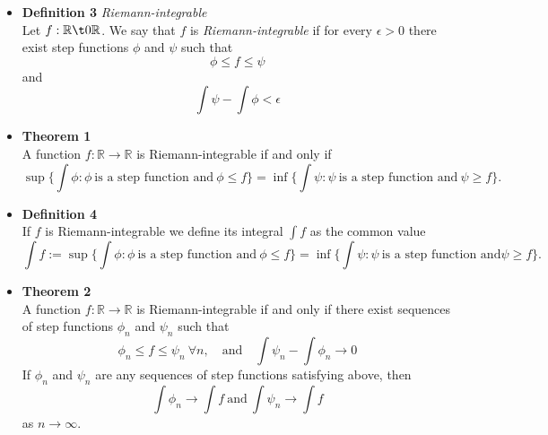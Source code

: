 \documentclass[11pt,a4paper]{article}
\begin{document}
\begin{itemize}
    \item \textbf{Definition 3} \emph{Riemann-integrable} \\
        Let $f : \mathbb{R} \t0 \mathbb{R}$.
        We say that $f$ is \emph{Riemann-integrable} if for every $\epsilon > 0$
        there exist step functions $\phi$ and $\psi$ such that
        \[
            \phi \leq f \leq \psi
        \]
        and
        \[
            \int \psi - \int \phi < \epsilon
        \]

    \item \textbf{Theorem 1} \\
        A function $f : \mathbb{R} \to \mathbb{R}$ is Riemann-integrable if and only if
        \[
            \sup \{ \int \phi : \phi \ \text{is a step function and} \ \phi \leq f \} =
            \inf \{ \int \psi : \psi \ \text{is a step function and} \ \psi \geq f \}.
        \]

    \item \textbf{Definition 4} \\
        If $f$ is Riemann-integrable we define its integral $\int f$ as the common value
        \[
            \int f := \sup \{ \int \phi : \phi \ \text{is a step function and} \ \phi \leq f \}
            = \inf \{ \int \psi : \psi \ \text{is a step function and} \psi \geq f \}.
        \]

    \item \textbf{Theorem 2} \\
        A function $f : \mathbb{R} \to \mathbb{R}$ is Riemann-integrable if and only if there
        exist sequences of step functions $\phi_n$ and $\psi_n$ such that
        \[
            \phi_n \leq f \leq \psi_n \ \forall n, \quad \text{and} \quad
            \int \psi_n - \int \phi_n \to 0
        \]
        If $\phi_n$ and $\psi_n$ are any sequences of step functions satisfying above, then
        \[
            \int \phi_n \to \int f \ \text{and} \ \int \psi_n \to \int f
        \]
        as $n \to \infty$.


\end{itemize}
\end{document}
